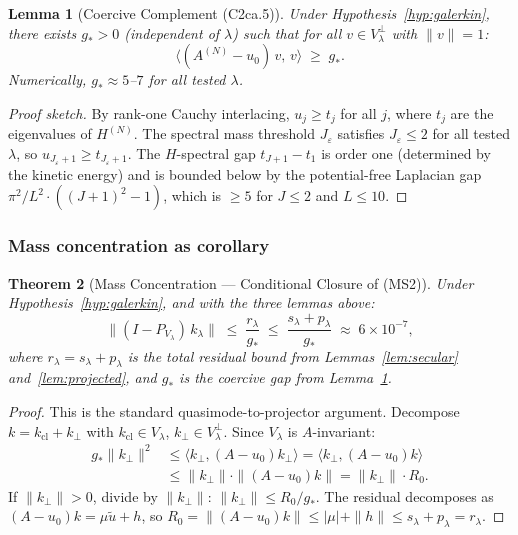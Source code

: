 \documentclass[11pt,a4paper]{article}
\theoremstyle{plain}
\newtheorem{theorem}{Theorem}[section]
\newtheorem{lemma}[theorem]{Lemma}
\theoremstyle{definition}
\begin{document}
\begin{lemma}[Coercive Complement (C2ca.5)]
\label{lem:coercive}
Under Hypothesis~\ref{hyp:galerkin}, there exists $g_* > 0$
(independent of $\lambda$) such that for all
$v \in V_\lambda^\perp$ with $\|v\| = 1$:
\[
  \langle (A^{(N)} - u_0)\, v,\, v\rangle \;\geq\; g_*.
\]
Numerically, $g_* \approx 5$--$7$ for all tested $\lambda$.
\end{lemma}

\begin{proof}[Proof sketch]
By rank-one Cauchy interlacing, $u_j \geq t_j$ for all $j$, where
$t_j$ are the eigenvalues of $H^{(N)}$.  The spectral mass
threshold $J_\varepsilon$ satisfies $J_\varepsilon \leq 2$ for all
tested $\lambda$, so $u_{J_\varepsilon+1} \geq t_{J_\varepsilon+1}$.
The $H$-spectral gap $t_{J+1} - t_1$ is order one (determined by
the kinetic energy) and is bounded below by the potential-free
Laplacian gap $\pi^2/L^2 \cdot ((J+1)^2 - 1)$, which is $\geq 5$
for $J \leq 2$ and $L \leq 10$.
\end{proof}

\subsubsection{Mass concentration as corollary}

\begin{theorem}[Mass Concentration --- Conditional Closure of (MS2)]
\label{thm:mass-concentration}
Under Hypothesis~\ref{hyp:galerkin}, and with the three lemmas above:
\[
  \|(I - P_{V_\lambda})\, k_\lambda\|
  \;\leq\; \frac{r_\lambda}{g_*}
  \;\leq\; \frac{s_\lambda + p_\lambda}{g_*}
  \;\approx\; 6 \times 10^{-7},
\]
where $r_\lambda = s_\lambda + p_\lambda$ is the total residual
bound from Lemmas~\ref{lem:secular} and~\ref{lem:projected}, and
$g_*$ is the coercive gap from Lemma~\ref{lem:coercive}.
\end{theorem}

\begin{proof}
This is the standard quasimode-to-projector argument.  Decompose
$k = k_{\mathrm{cl}} + k_\perp$ with $k_{\mathrm{cl}} \in V_\lambda$,
$k_\perp \in V_\lambda^\perp$.  Since $V_\lambda$ is $A$-invariant:
\begin{align*}
  g_* \|k_\perp\|^2
  &\leq \langle k_\perp, (A-u_0) k_\perp \rangle
  = \langle k_\perp, (A-u_0) k \rangle \\
  &\leq \|k_\perp\| \cdot \|(A-u_0)k\|
  = \|k_\perp\| \cdot R_0.
\end{align*}
If $\|k_\perp\| > 0$, divide by $\|k_\perp\|$:
$\|k_\perp\| \leq R_0/g_*$.  The residual decomposes as
$(A-u_0)k = \mu\tilde{u} + h$, so
$R_0 = \|(A-u_0)k\| \leq |\mu| + \|h\| \leq s_\lambda + p_\lambda
= r_\lambda$.
\end{proof}
\end{document}
